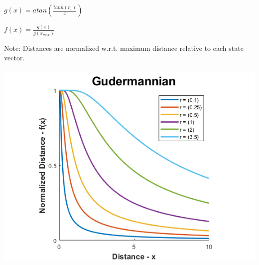 \documentclass[12pt, a4paper, titlepage, openany]{book}
\begin{document}
\begin{description}[labelsep=1cm, labelwidth=2cm, nosep,,style=multiline,leftmargin=3cm]
\begin{description}[labelsep=14em, labelwidth=10em, nosep,style=multiline,leftmargin=6cm]
	\item[\texttt{"gudermannian"}] 	$g(x) = atan(\frac{tanh(r_1)}{x})$
	\item[]	$f(x) = \frac{g(x)}{g(x_{max})}$
	\item[]		Note: Distances are normalized w.r.t. maximum distance relative to each state vector.\\ \ \\
		\includegraphics[scale=.5]{FuzzGv1.png} \\
	\end{description}
	

\end{description}
\end{document}
